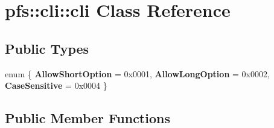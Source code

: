 \hypertarget{classpfs_1_1cli_1_1cli}{\section{pfs\-:\-:cli\-:\-:cli Class Reference}
\label{classpfs_1_1cli_1_1cli}
}
\subsection*{Public Types}
\begin{DoxyCompactItemize}
\item 
enum \{ {\bfseries Allow\-Short\-Option} = 0x0001, 
{\bfseries Allow\-Long\-Option} = 0x0002, 
{\bfseries Case\-Sensitive} = 0x0004
 \}
\end{DoxyCompactItemize}
\subsection*{Public Member Functions}
